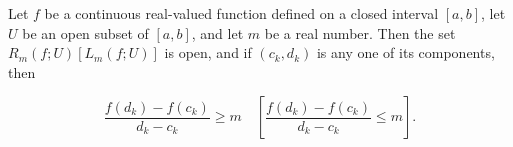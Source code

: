 Let $f$ be a continuous real-valued function defined on a closed interval $[a, b]$, let $U$ be an open subset of $[a, b]$, and let $m$ be a real number. Then the set $R_m(f; U) [L_m(f; U)]$ is open, and if $(c_k, d_k)$ is any one of its components, then

$$\frac{f(d_k) - f(c_k)}{d_k - c_k} \geq m \quad \left[ \frac{f(d_k) - f(c_k)}{d_k - c_k} \leq m \right].$$
